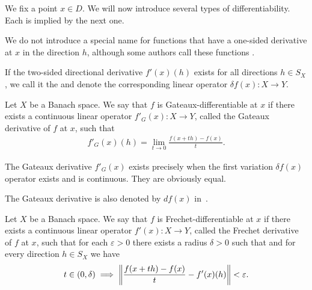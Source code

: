 \begin{definition}\label{def:differentiability}
  We fix a point \( x \in D \). We will now introduce several types of differentiability. Each is implied by the next one.

  \begin{defenum}
    \item We do not introduce a special name for functions that have a one-sided derivative at \( x \) in the direction \( h \), although some authors call these functions . %

    \item\label{def:differentiability/two-sided}\cite[0.2.1]{Ioffe1974} If the two-sided directional derivative \( f'(x)(h) \) exists for all directions \( h \in S_X \), we call it the  and denote the corresponding linear operator \( \delta f(x): X \to Y \).

    \item\label{def:differentiability/gateaux}\cite[definition 1.12]{Phelps1993} Let \( X \) be a Banach space. We say that \( f \) is Gateaux-differentiable at \( x \) if there exists a continuous linear operator \( f'_G(x): X \to Y \), called the Gateaux derivative of \( f \) at \( x \), such that
    \begin{align*}
      f'_G(x)(h) = \lim_{t \to 0} \frac {f(x + th) - f(x)} t.
    \end{align*}

    The Gateaux derivative \( f'_G(x) \) exists precisely when the first variation \( \delta f(x) \) operator exists and is continuous. They are obviously equal.

    The Gateaux derivative is also denoted by \( df(x) \) in~\cite[definition 1.12]{Phelps1993}.

    \item\label{def:differentiability/frechet}\cite[definition 1.12]{Phelps1993} Let \( X \) be a Banach space. We say that \( f \) is Frechet-differentiable at \( x \) if there exists a continuous linear operator \( f'(x): X \to Y \), called the Frechet derivative of \( f \) at \( x \), such that for each \( \varepsilon > 0 \) there exists a radius \( \delta > 0 \) such that and for every direction \( h \in S_X \) we have
    \begin{align*}
      t \in (0, \delta) \implies \left\Vert  \frac {f(x + th) - f(x)} t - f'(x)(h) \right\Vert < \varepsilon.
    \end{align*}


\end{defenum}
\end{definition}
